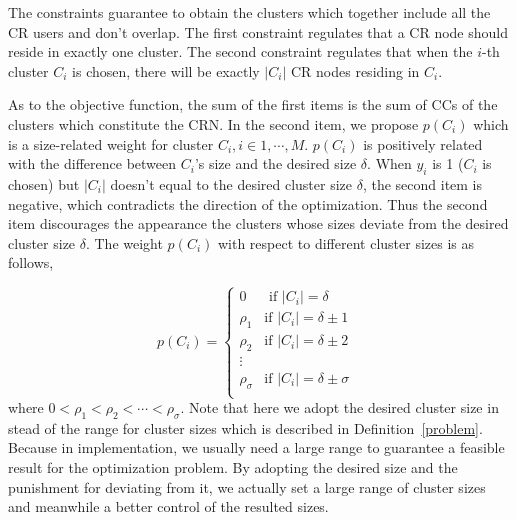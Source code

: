 \documentclass[times]{ettauth}
\theoremstyle{mytheoremstyle}
\theoremstyle{mytheoremstyle}
\theoremstyle{mytheoremstyle}
\begin{document}
The constraints guarantee to obtain the clusters which together include all the CR users and don't overlap.
The first constraint regulates that a CR node should reside in exactly one cluster.
The second constraint regulates that when the $i$-th cluster $C_i$ is chosen, there will be exactly $|C_i|$ CR nodes residing in $C_i$.

As to the objective function, the sum of the first items is the sum of CCs of the clusters which constitute the CRN.
In the second item, we propose $p(C_i)$ which is a size-related weight for cluster $C_i, i\in{1,\cdots, M}$.
$p(C_i)$ is positively related with the difference between $C_i$'s size and the desired size $\delta$.
When $y_i$ is 1 ($C_i$ is chosen) but $|C_i|$ doesn't equal to the desired cluster size $\delta$, the second item is negative, which contradicts the direction of the optimization.
Thus the second item discourages the appearance the clusters whose sizes deviate from the desired cluster size $\delta$.
The weight $p(C_i)$ with respect to different cluster sizes is as follows,

$$
p(C_i) = \left\{ \begin{array}{rl}
0 &\mbox{ if $|C_i|=\delta$} \\
\rho_1 &\mbox{if $|C_i|=\delta \pm 1$ } \\
\rho_2 &\mbox{if $|C_i|=\delta \pm 2$} \\
\vdots\\
\rho_\sigma &\mbox{if $|C_i|=\delta \pm \sigma$} \\
\end{array} \right.
$$
where $ 0 < \rho_1< \rho_2 < \cdots < \rho_\sigma$.
Note that here we adopt the desired cluster size in stead of the range for cluster sizes which is described in Definition~\ref{problem}.
Because in implementation, we usually need a large range to guarantee a feasible result for the optimization problem.
By adopting the desired size and the punishment for deviating from it, we actually set a large range of cluster sizes and meanwhile a better control of the resulted sizes. 
\end{document}
